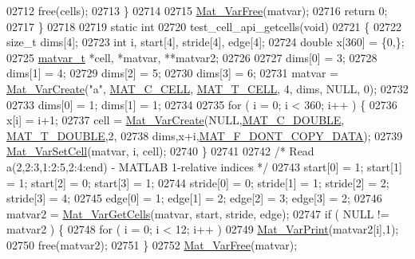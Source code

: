\begin{DoxyCode}
{{{{{{{{02712         free(cells);
02713     \}
02714 
02715     \hyperlink{group___m_a_t_ga1d14716f7450530fd1c9d02413787f0e}{Mat\_VarFree}(matvar);
02716     \textcolor{keywordflow}{return} 0;
02717 \}
02718 
02719 \textcolor{keyword}{static} \textcolor{keywordtype}{int}
02720 test\_cell\_api\_getcells(\textcolor{keywordtype}{void})
02721 \{
02722     \textcolor{keywordtype}{size\_t} dims[4];
02723     \textcolor{keywordtype}{int}    i, start[4], stride[4], edge[4];
02724     \textcolor{keywordtype}{double}    x[360] = \{0,\};
02725     \hyperlink{group___m_a_t_structmatvar__t}{matvar\_t} *cell, *matvar, **matvar2;
02726 
02727     dims[0] = 3;
02728     dims[1] = 4;
02729     dims[2] = 5;
02730     dims[3] = 6;
02731     matvar = \hyperlink{group___m_a_t_ga1c54a84bb4d810c6fccdb8869489eac4}{Mat\_VarCreate}(\textcolor{stringliteral}{"a"}, \hyperlink{group___m_a_t_ggad4d60ae7b709fc81bfd744fb4c857c40a2f7abb47a1c51e248bd4e5e03cc81b08}{MAT\_C\_CELL}, \hyperlink{group___m_a_t_ggacf7b3b879282b7ab3a51190e49bf3453a07599cf2cca6d2b2d059378563318ba5}{MAT\_T\_CELL}, 4, dims, NULL, 0);
02732 
02733     dims[0] = 1; dims[1] = 1;
02734 
02735     \textcolor{keywordflow}{for} ( i = 0; i < 360; i++ ) \{
02736         x[i] = i+1;
02737         cell = \hyperlink{group___m_a_t_ga1c54a84bb4d810c6fccdb8869489eac4}{Mat\_VarCreate}(NULL,\hyperlink{group___m_a_t_ggad4d60ae7b709fc81bfd744fb4c857c40a5d70e0862e5bdb7bd86bf7ba5948f307}{MAT\_C\_DOUBLE},
      \hyperlink{group___m_a_t_ggacf7b3b879282b7ab3a51190e49bf3453a31e721ecf7e188196f83c32838288797}{MAT\_T\_DOUBLE},2,
02738                               dims,x+i,\hyperlink{group___m_a_t_ggab9d6ef9e3ddca78a317b173f01d53fbba762244499f52eb35e7b53fb79a1f2889}{MAT\_F\_DONT\_COPY\_DATA});
02739         \hyperlink{group___m_a_t_ga1b2c36f27ba592206c22c584a30a3c5c}{Mat\_VarSetCell}(matvar, i, cell);
02740     \}
02741 
02742     \textcolor{comment}{/* Read a(2,2:3,1:2:5,2:4:end) - MATLAB 1-relative indices */}
02743     start[0]  = 1; start[1]  = 1; start[2]  = 0; start[3]  = 1;
02744     stride[0] = 0; stride[1] = 1; stride[2] = 2; stride[3] = 4;
02745     edge[0]   = 1; edge[1]   = 2; edge[2]   = 3; edge[3]   = 2;
02746     matvar2 = \hyperlink{group___m_a_t_ga0732b0a6c40975b036068b9a14422d45}{Mat\_VarGetCells}(matvar, start, stride, edge);
02747     \textcolor{keywordflow}{if} ( NULL != matvar2 ) \{
02748         \textcolor{keywordflow}{for} ( i = 0; i < 12; i++ )
02749             \hyperlink{group___m_a_t_ga9100c145e338b84b55d5d0795d5d390a}{Mat\_VarPrint}(matvar2[i],1);
02750         free(matvar2);
02751     \}
02752     \hyperlink{group___m_a_t_ga1d14716f7450530fd1c9d02413787f0e}{Mat\_VarFree}(matvar);
}}}}}}}}
\end{DoxyCode}
